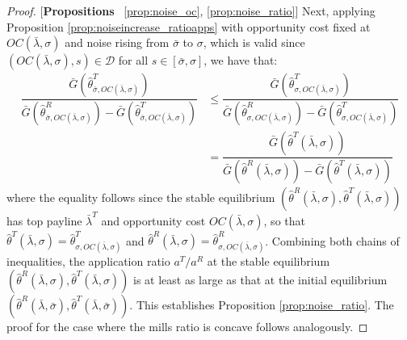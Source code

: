 \begin{proof}{[\textbf{Propositions} ~\ref{prop:noise_oc}, \ref{prop:noise_ratio}]}
\noindent Next, applying Proposition \ref{prop:noiseincrease_ratioapps} with opportunity cost fixed at $OC(\bar{\lambda},\sigma)$ and noise rising from $\bar{\sigma}$ to $\sigma$, which is valid since $(OC(\bar{\lambda},\sigma),s)\in\mathcal{D}$ for all $s\in[\bar{\sigma},\sigma]$, we have that:
\begin{align*}
    \dfrac{\bar{G}(\hat{\theta}^T_{\bar{\sigma},OC(\bar{\lambda},\sigma)})}{\bar{G}(\hat{\theta}^R_{\bar{\sigma},OC(\bar{\lambda},\sigma)}) - \bar{G}(\hat{\theta}^T_{\bar{\sigma},OC(\bar{\lambda},\sigma)})} &\leq \dfrac{\bar{G}(\hat{\theta}^T_{\sigma,OC(\bar{\lambda},\sigma)})}{\bar{G}(\hat{\theta}^R_{\sigma,OC(\bar{\lambda},\sigma)}) - \bar{G}(\hat{\theta}^T_{\sigma,OC(\bar{\lambda},\sigma)})} \\
    &= \dfrac{\bar{G}(\hat{\theta}^T(\bar{\lambda},\sigma) )}{\bar{G}(\hat{\theta}^R(\bar{\lambda},\sigma) ) - \bar{G}(\hat{\theta}^T(\bar{\lambda},\sigma) )}
\end{align*}
where the equality follows since the stable equilibrium $(\hat{\theta}^R(\bar{\lambda},\sigma),\hat{\theta}^T(\bar{\lambda},\sigma))$ has top payline $\bar{\lambda}^T$ and opportunity cost $OC(\bar{\lambda},\sigma)$, so that $\hat{\theta}^T(\bar{\lambda},\sigma) = \hat{\theta}^T_{\sigma,OC(\bar{\lambda},\sigma)}$ and $\hat{\theta}^R(\bar{\lambda},\sigma) = \hat{\theta}^R_{\sigma,OC(\bar{\lambda},\sigma)}$. Combining both chains of inequalities, the application ratio $a^T/a^R$ at the stable equilibrium $(\hat{\theta}^R(\bar{\lambda},\sigma),\hat{\theta}^T(\bar{\lambda},\sigma))$ is at least as large as that at the initial equilibrium $(\hat{\theta}^R(\bar{\lambda},\bar{\sigma}),\hat{\theta}^T(\bar{\lambda},\bar{\sigma}))$. This establishes Proposition \ref{prop:noise_ratio}. The proof for the case where the mills ratio is concave follows analogously. 
\end{proof}

